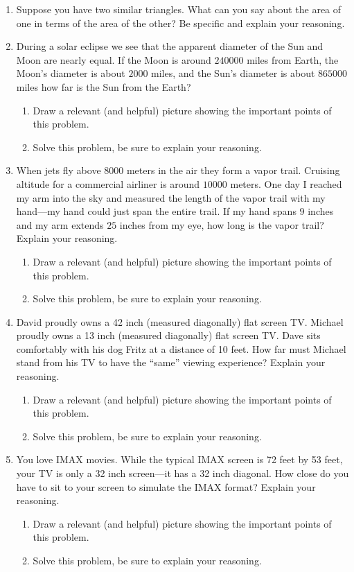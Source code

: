 \begin{problems}
\begin{enumerate}
\item Suppose you have two similar triangles. What can you say about
  the area of one in terms of the area of the other? Be specific and
  explain your reasoning.

\item During a solar eclipse we see that the apparent diameter of the
  Sun and Moon are nearly equal. If the Moon is around $240000$ miles
  from Earth, the Moon's diameter is about $2000$ miles, and the Sun's
  diameter is about $865000$ miles how far is the Sun from the Earth?
\begin{enumerate}
\item Draw a relevant (and helpful) picture showing the important
  points of this problem.
\item Solve this problem, be sure to explain your reasoning.
\end{enumerate}


\item When jets fly above $8000$ meters in the air they form a vapor
  trail. Cruising altitude for a commercial airliner is around $10000$
  meters. One day I reached my arm into the sky and measured the
  length of the vapor trail with my hand---my hand could just span the
  entire trail. If my hand spans $9$ inches and my arm extends $25$
  inches from my eye, how long is the vapor trail? Explain your
  reasoning.
\begin{enumerate}
\item Draw a relevant (and helpful) picture showing the important
  points of this problem.
\item Solve this problem, be sure to explain your reasoning.
\end{enumerate}

\item David proudly owns a 42 inch (measured diagonally) flat screen
  TV. Michael proudly owns a 13 inch (measured diagonally) flat screen
  TV. Dave sits comfortably with his dog Fritz at a distance of 10
  feet. How far must Michael stand from his TV to have the ``same''
  viewing experience?  Explain your reasoning.
\begin{enumerate}
\item Draw a relevant (and helpful) picture showing the important
  points of this problem.
\item Solve this problem, be sure to explain your reasoning.
\end{enumerate}

\item You love IMAX movies. While the typical IMAX screen is 72 feet
  by 53 feet, your TV is only a 32 inch screen---it has a 32 inch
  diagonal. How close do you have to sit to your screen to simulate
  the IMAX format? Explain your reasoning.
\begin{enumerate}
\item Draw a relevant (and helpful) picture showing the important
  points of this problem.
\item Solve this problem, be sure to explain your reasoning.
\end{enumerate}


\end{enumerate}
\end{problems}
